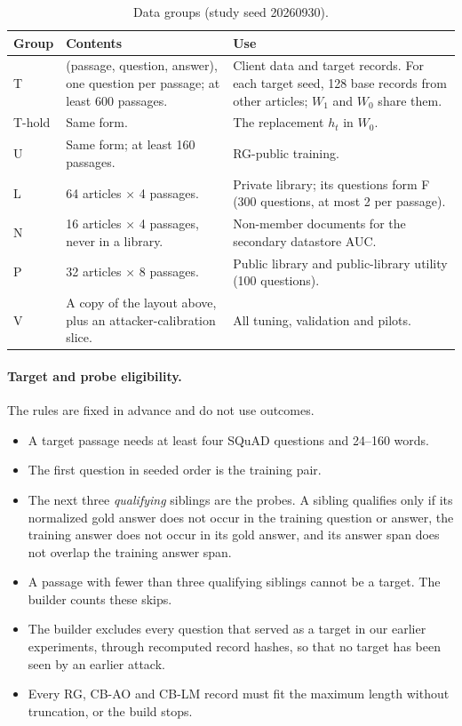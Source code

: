 \documentclass[11pt]{article}
\begin{document}
\begin{table}[tbp]
\centering
\small
\caption{Data groups (study seed 20260930).}\label{tab:groups}
\begin{tabular}{@{}L{0.10\textwidth}L{0.42\textwidth}L{0.42\textwidth}@{}}
\toprule
Group & Contents & Use \\
\midrule
T & (passage, question, answer), one question per passage; at least 600 passages. & Client data and target records. For each target seed, 128 base records from other articles; $W_1$ and $W_0$ share them. \\
T-hold & Same form. & The replacement $h_t$ in $W_0$. \\
U & Same form; at least 160 passages. & RG-public training. \\
L & 64 articles $\times$ 4 passages. & Private library; its questions form F (300 questions, at most 2 per passage). \\
N & 16 articles $\times$ 4 passages, never in a library. & Non-member documents for the secondary datastore AUC. \\
P & 32 articles $\times$ 8 passages. & Public library and public-library utility (100 questions). \\
V & A copy of the layout above, plus an attacker-calibration slice. & All tuning, validation and pilots. \\
\bottomrule
\end{tabular}
\end{table}

\paragraph{Target and probe eligibility.} The rules are fixed in advance and do not use outcomes.
\begin{itemize}
  \item A target passage needs at least four SQuAD questions and 24--160 words.
  \item The first question in seeded order is the training pair.
  \item The next three \emph{qualifying} siblings are the probes. A sibling qualifies only if its normalized gold answer does not occur in the training question or answer, the training answer does not occur in its gold answer, and its answer span does not overlap the training answer span.
  \item A passage with fewer than three qualifying siblings cannot be a target. The builder counts these skips.
  \item The builder excludes every question that served as a target in our earlier experiments, through recomputed record hashes, so that no target has been seen by an earlier attack.
  \item Every RG, CB-AO and CB-LM record must fit the maximum length without truncation, or the build stops.
\end{itemize}
\end{document}
